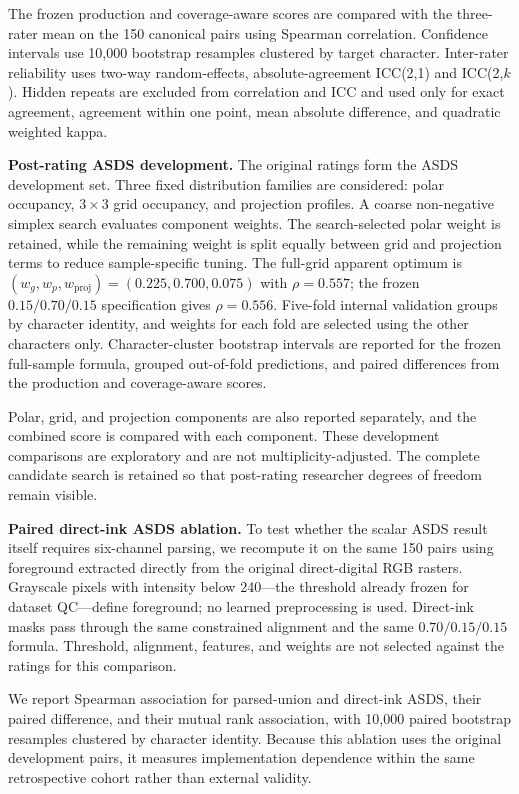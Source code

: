 The frozen production and coverage-aware scores are compared with the
three-rater mean on the 150 canonical pairs using Spearman correlation.
Confidence intervals use 10,000 bootstrap resamples clustered by target
character. Inter-rater reliability uses two-way random-effects,
absolute-agreement ICC(2,1) and ICC(2,\(k\)). Hidden repeats are excluded from
correlation and ICC and used only for exact agreement, agreement within one
point, mean absolute difference, and quadratic weighted kappa.

\medskip
\noindent\textbf{Post-rating ASDS development.}
\label{sec:asds-development}
The original ratings form the ASDS development set. Three fixed distribution
families are considered: polar occupancy, \(3\times3\) grid occupancy, and
projection profiles. A coarse non-negative simplex search evaluates component
weights. The search-selected polar weight is retained, while the remaining
weight is split equally between grid and projection terms to reduce
sample-specific tuning. The full-grid apparent optimum is
\((w_g,w_p,w_{\mathrm{proj}})=(0.225,0.700,0.075)\) with
\(\rho=0.557\); the frozen \(0.15/0.70/0.15\) specification gives
\(\rho=0.556\). Five-fold internal validation groups by character identity,
and weights for each fold are selected using the other characters only.
Character-cluster bootstrap intervals are reported for the frozen full-sample
formula, grouped out-of-fold predictions, and paired differences from the
production and coverage-aware scores.

Polar, grid, and projection components are also reported separately, and the
combined score is compared with each component. These development comparisons
are exploratory and are not multiplicity-adjusted. The complete candidate
search is retained so that post-rating researcher degrees of freedom remain
visible.

\medskip
\noindent\textbf{Paired direct-ink ASDS ablation.}
\label{sec:direct-ink-ablation}
To test whether the scalar ASDS result itself requires six-channel parsing, we
recompute it on the same 150 pairs using foreground extracted directly from
the original direct-digital RGB rasters. Grayscale pixels with intensity below
240---the threshold already frozen for dataset QC---define foreground; no
learned preprocessing is used. Direct-ink masks pass through the same
constrained alignment and the same \(0.70/0.15/0.15\) formula. Threshold,
alignment, features, and weights are not selected against the ratings for this
comparison.

We report Spearman association for parsed-union and direct-ink ASDS, their
paired difference, and their mutual rank association, with 10,000 paired
bootstrap resamples clustered by character identity. Because this ablation
uses the original development pairs, it measures implementation dependence
within the same retrospective cohort rather than external validity.
